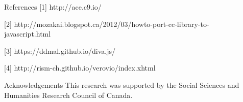 \documentclass[final]{beamer}
\begin{document}
\begin{frame}[fragile,t]
\begin{minipage}[t][.8\textheight]{\textwidth}
\begin{columns}
\begin{column}{0.95\textwidth}
\begin{block}{}
\begin{columns}
\begin{column}{0.47\textwidth}
            \vspace{1cm}

            \begin{block}{\large References}
            \footnotesize
            [1] http://ace.c9.io/

            [2] http://mozakai.blogspot.ca/2012/03/howto-port-cc-library-to-javascript.html

            [3] https://ddmal.github.io/diva.js/

            [4] http://rism-ch.github.io/verovio/index.xhtml
            \end{block}   


            \vfill

            \begin{block}{\large Acknowledgements}
            \footnotesize
            This research was supported by the Social Sciences and Humanities Research Council of Canada.
            \end{block}
        \end{column}
        \end{columns}
        \end{block}

    \end{column}

\begin{column}{0.00\textwidth}
\end{column}
\end{columns}
\end{minipage}
\end{frame}
\end{document}
